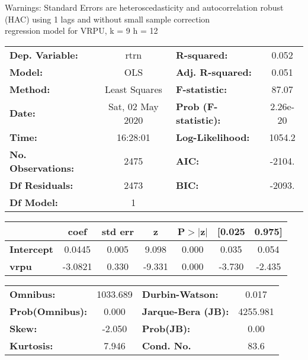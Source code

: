 Warnings: \newline
 [1] Standard Errors are heteroscedasticity and autocorrelation robust (HAC) using 1 lags and without small sample correction\\ 

regression model for VRPU, k = 9 h = 12\begin{center}
\begin{tabular}{lclc}
\toprule
\textbf{Dep. Variable:}    &       rtrn       & \textbf{  R-squared:         } &     0.052   \\
\textbf{Model:}            &       OLS        & \textbf{  Adj. R-squared:    } &     0.051   \\
\textbf{Method:}           &  Least Squares   & \textbf{  F-statistic:       } &     87.07   \\
\textbf{Date:}             & Sat, 02 May 2020 & \textbf{  Prob (F-statistic):} &  2.26e-20   \\
\textbf{Time:}             &     16:28:01     & \textbf{  Log-Likelihood:    } &    1054.2   \\
\textbf{No. Observations:} &        2475      & \textbf{  AIC:               } &    -2104.   \\
\textbf{Df Residuals:}     &        2473      & \textbf{  BIC:               } &    -2093.   \\
\textbf{Df Model:}         &           1      & \textbf{                     } &             \\
\bottomrule
\end{tabular}
\begin{tabular}{lcccccc}
                   & \textbf{coef} & \textbf{std err} & \textbf{z} & \textbf{P$> |$z$|$} & \textbf{[0.025} & \textbf{0.975]}  \\
\midrule
\textbf{Intercept} &       0.0445  &        0.005     &     9.098  &         0.000        &        0.035    &        0.054     \\
\textbf{vrpu}      &      -3.0821  &        0.330     &    -9.331  &         0.000        &       -3.730    &       -2.435     \\
\bottomrule
\end{tabular}
\begin{tabular}{lclc}
\textbf{Omnibus:}       & 1033.689 & \textbf{  Durbin-Watson:     } &    0.017  \\
\textbf{Prob(Omnibus):} &   0.000  & \textbf{  Jarque-Bera (JB):  } & 4255.981  \\
\textbf{Skew:}          &  -2.050  & \textbf{  Prob(JB):          } &     0.00  \\
\textbf{Kurtosis:}      &   7.946  & \textbf{  Cond. No.          } &     83.6  \\
\bottomrule
\end{tabular}
\end{center}

